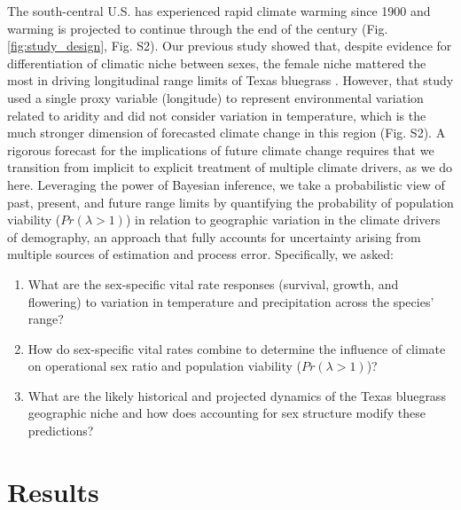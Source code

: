 \documentclass[9pt,twocolumn,twoside,lineno]{pnas-new}
\begin{document}
The south-central U.S. has experienced rapid climate warming since 1900 and warming is projected to continue through the end of the century (Fig. \ref{fig:study_design}, Fig. S2). 
Our previous study showed that, despite evidence for differentiation of climatic niche between sexes, the female niche mattered the most in driving longitudinal range limits of Texas bluegrass \citep{miller2022two}. 
However, that study used a single proxy variable (longitude) to represent environmental variation related to aridity and did not consider variation in temperature, which is the much stronger dimension of forecasted climate change in this region (Fig. S2). 
A rigorous forecast for the implications of future climate change requires that we transition from implicit to explicit treatment of multiple climate drivers, as we do here.
Leveraging the power of Bayesian inference, we take a probabilistic view of past, present, and future range limits by quantifying the probability of population viability ($Pr(\lambda > 1)$) in relation to geographic variation in the climate drivers of demography, an approach that fully accounts for uncertainty arising from multiple sources of estimation and process error. %
Specifically, we asked:
\begin{enumerate}
	\item What are the sex-specific vital rate responses (survival, growth, and flowering) to variation in temperature and precipitation across the species' range?
	\item How do sex-specific vital rates combine to determine the influence of climate on operational sex ratio and population viability ($Pr(\lambda > 1)$)?
	\item What are the likely historical and projected dynamics of the Texas bluegrass geographic niche and how does accounting for sex structure modify these predictions?
\end{enumerate}

\section*{Results}
\end{document}
